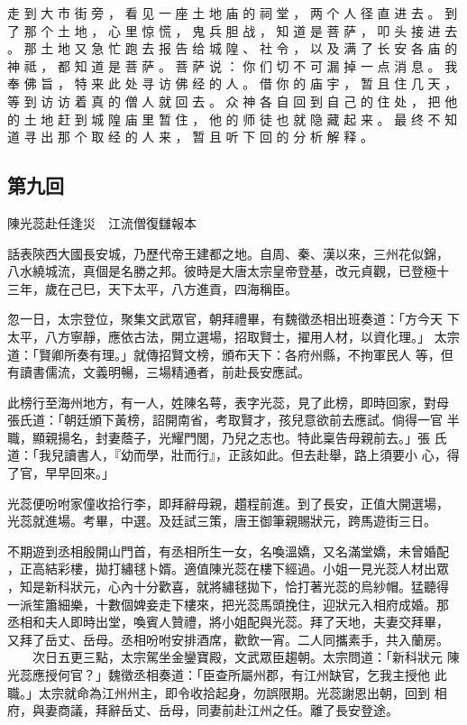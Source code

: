 {走 到 大 市 街 旁 ， 看 见 一 座 土 地 庙 的 祠 堂 ， 两 个 人 径 直 进 去 。
到 了 那 个 土 地 ， 心 里 惊 慌 ， 鬼 兵 胆 战 ， 知 道 是 菩 萨 ， 叩 头 接 进 去 。
那 土 地 又 急 忙 跑 去 报 告 给 城 隍 、 社 令 ， 以 及 满 了 长 安 各 庙 的 神 祗 ， 都 知 道 是 菩 萨 。
菩 萨 说 ： 你 们 切 不 可 漏 掉 一 点 消 息 。
我 奉 佛 旨 ， 特 来 此 处 寻 访 佛 经 的 人 。
借 你 的 庙 宇 ， 暂 且 住 几 天 ， 等 到 访 访 着 真 的 僧 人 就 回 去 。
众 神 各 自 回 到 自 己 的 住 处 ， 把 他 的 土 地 赶 到 城 隍 庙 里 暂 住 ， 他 的 师 徒 也 就 隐 藏 起 来 。
最 终 不 知 道 寻 出 那 个 取 经 的 人 来 ， 暂 且 听 下 回 的 分 析 解 释 。
}\switchcolumn\flushpage  \begin{pinyinscope}{\myfontt \section{第九回}     陳光蕊赴任逢災　江流僧復讎報本

話表陝西大國長安城，乃歷代帝王建都之地。自周、秦、漢以來，三州花似錦，
八水繞城流，真個是名勝之邦。彼時是大唐太宗皇帝登基，改元貞觀，已登極十
三年，歲在己巳，天下太平，八方進貢，四海稱臣。

忽一日，太宗登位，聚集文武眾官，朝拜禮畢，有魏徵丞相出班奏道：「方今天
下太平，八方寧靜，應依古法，開立選場，招取賢士，擢用人材，以資化理。」
太宗道：「賢卿所奏有理。」就傳招賢文榜，頒布天下：各府州縣，不拘軍民人
等，但有讀書儒流，文義明暢，三場精通者，前赴長安應試。

此榜行至海州地方，有一人，姓陳名萼，表字光蕊，見了此榜，即時回家，對母
張氏道：「朝廷頒下黃榜，詔開南省，考取賢才，孩兒意欲前去應試。倘得一官
半職，顯親揚名，封妻蔭子，光耀門閭，乃兒之志也。特此稟告母親前去。」張
氏道：「我兒讀書人，『幼而學，壯而行』，正該如此。但去赴舉，路上須要小
心，得了官，早早回來。」

光蕊便吩咐家僮收拾行李，即拜辭母親，趲程前進。到了長安，正值大開選場，
光蕊就進場。考畢，中選。及廷試三策，唐王御筆親賜狀元，跨馬遊街三日。

不期遊到丞相殷開山門首，有丞相所生一女，名喚溫嬌，又名滿堂嬌，未曾婚配
，正高結彩樓，拋打繡毬卜婿。適值陳光蕊在樓下經過。小姐一見光蕊人材出眾
，知是新科狀元，心內十分歡喜，就將繡毬拋下，恰打著光蕊的烏紗帽。猛聽得
一派笙簫細樂，十數個婢妾走下樓來，把光蕊馬頭挽住，迎狀元入相府成婚。那
丞相和夫人即時出堂，喚賓人贊禮，將小姐配與光蕊。拜了天地，夫妻交拜畢，
又拜了岳丈、岳母。丞相吩咐安排酒席，歡飲一宵。二人同攜素手，共入蘭房。
　　次日五更三點，太宗駕坐金鑾寶殿，文武眾臣趨朝。太宗問道：「新科狀元
陳光蕊應授何官？」魏徵丞相奏道：「臣查所屬州郡，有江州缺官，乞我主授他
此職。」太宗就命為江州州主，即令收拾起身，勿誤限期。光蕊謝恩出朝，回到
相府，與妻商議，拜辭岳丈、岳母，同妻前赴江州之任。離了長安登途。

}
\end{pinyinscope}
